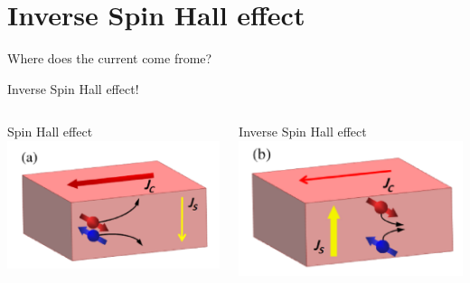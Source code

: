 \documentclass[aspectratio=1610, 9pt]{beamer}
\begin{document}
\section{Inverse Spin Hall effect}
\begin{frame}{Where does the current come frome?}
\begin{center}
Inverse Spin Hall effect!
\end{center}
\begin{columns}
  \begin{column}{0.5\textwidth}
  Spin Hall effect
  \includegraphics[width=\textwidth]{pics/Spin_Hall.png}
  \end{column}
  \begin{column}{0.5\textwidth}
    Inverse Spin Hall effect
    \includegraphics[width=\textwidth]{pics/inv_spin_hall.png}
  \end{column}
\end{columns}
\end{frame}
\end{document}
